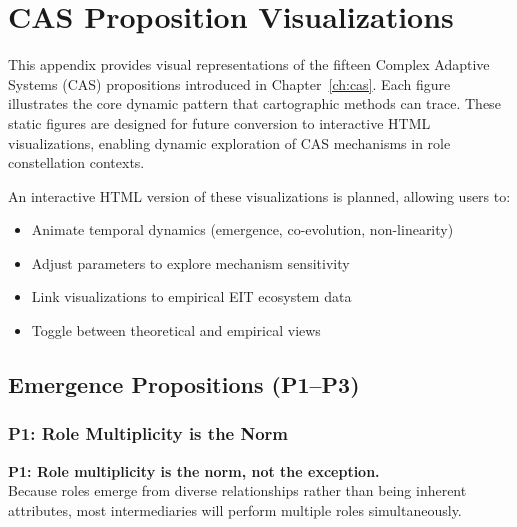\documentclass[../main.tex]{subfiles}
\begin{document}

\chapter{CAS Proposition Visualizations}

This appendix provides visual representations of the fifteen Complex Adaptive Systems (CAS) propositions introduced in Chapter~\ref{ch:cas}. Each figure illustrates the core dynamic pattern that cartographic methods can trace. These static figures are designed for future conversion to interactive HTML visualizations, enabling dynamic exploration of CAS mechanisms in role constellation contexts.

\begin{kaobox}[title=Interactive Version]
An interactive HTML version of these visualizations is planned, allowing users to:
\begin{itemize}[leftmargin=*, itemsep=0.1em]
\item Animate temporal dynamics (emergence, co-evolution, non-linearity)
\item Adjust parameters to explore mechanism sensitivity
\item Link visualizations to empirical EIT ecosystem data
\item Toggle between theoretical and empirical views
\end{itemize}
\end{kaobox}

\section{Emergence Propositions (P1--P3)}

\subsection{P1: Role Multiplicity is the Norm}

\begin{propositionbox}
\textbf{P1: Role multiplicity is the norm, not the exception.}\\[3pt]
Because roles emerge from diverse relationships rather than being inherent attributes, most intermediaries will perform multiple roles simultaneously.
\end{propositionbox}
\end{document}
